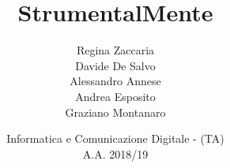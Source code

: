 
\newcommand{\theteam}{F.S.C.}

\newcommand{\ProjectTitle}{StrumentalMente}

\title{\ProjectTitle}

\author
{
	Regina Zaccaria\\
	Davide De Salvo\\
	Alessandro Annese\\
	Andrea Esposito\\
	Graziano Montanaro
}

\date
{
	Informatica e Comunicazione Digitale - (TA)\\
	{\Large A.A. 2018/19}
}